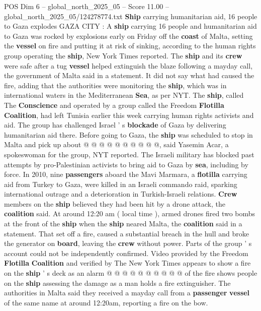\begin{textsample}{POS Dim 6 – global\_north\_2025\_05 – Score 11.00 – global\_north\_2025\_05/124278774.txt}  \label{ex:f6_pos_050}
\textbf{Ship} carrying humanitarian aid, 16 people to Gaza explodes GAZA CITY : A \textbf{ship} carrying 16 people and humanitarian aid to Gaza was rocked by explosions early on Friday off the \textbf{coast} of Malta, setting the \textbf{vessel} on fire and putting it at risk of sinking, according to the human rights group operating the \textbf{ship}, New York Times reported.
The \textbf{ship} and its \textbf{crew} were safe after a tug \textbf{vessel} helped extinguish the blaze following a mayday call, the government of Malta said in a statement.
It did not say what had caused the fire, adding that the authorities were monitoring the \textbf{ship}, which was in international waters in the Mediterranean \textbf{Sea}, as per NYT.
The \textbf{ship}, called The \textbf{Conscience} and operated by a group called the Freedom \textbf{Flotilla} \textbf{Coalition}, had left Tunisia earlier this week carrying human rights activists and aid.
The group has challenged Israel ' s \textbf{blockade} of Gaza by delivering humanitarian aid there.
Before going to Gaza, the \textbf{ship} was scheduled to stop in Malta and pick up about @ @ @ @ @ @ @ @ @ @, said Yasemin Acar, a spokeswoman for the group, NYT reported.
The Israeli military has blocked past attempts by pro-Palestinian activists to bring aid to Gaza by \textbf{sea}, including by force.
In 2010, nine \textbf{passengers} aboard the Mavi Marmara, a \textbf{flotilla} carrying aid from Turkey to Gaza, were killed in an Israeli commando raid, sparking international outrage and a deterioration in Turkish-Israeli relations. \textbf{Crew} members on the \textbf{ship} believed they had been hit by a drone attack, the \textbf{coalition} said.
At around 12:20 am ( local time ), armed drones fired two bombs at the front of the \textbf{ship} when the \textbf{ship} neared Malta, the \textbf{coalition} said in a statement.
That set off a fire, caused a substantial breach in the hull and broke the generator on \textbf{board}, leaving the \textbf{crew} without power.
Parts of the group ' s account could not be independently confirmed.
Video provided by the Freedom \textbf{Flotilla} \textbf{Coalition} and verified by The New York Times appears to show a fire on the \textbf{ship} ' s deck as an alarm @ @ @ @ @ @ @ @ @ @ of the fire shows people on the \textbf{ship} assessing the damage as a man holds a fire extinguisher.
The authorities in Malta said they received a mayday call from a \textbf{passenger} \textbf{vessel} of the same name at around 12:20am, reporting a fire on the bow.

\end{textsample}
